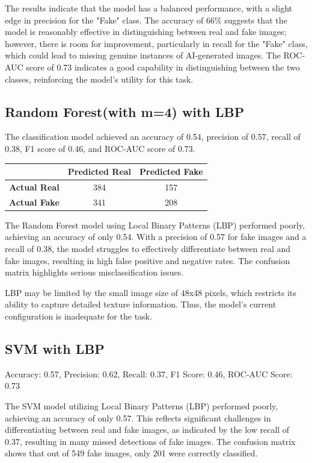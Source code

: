 \documentclass[10pt,twocolumn,letterpaper]{article}
\begin{document}
The results indicate that the model has a balanced performance, with a slight edge in precision for the "Fake" class. The accuracy of 66\% suggests that the model is reasonably effective in distinguishing between real and fake images; however, there is room for improvement, particularly in recall for the "Fake" class, which could lead to missing genuine instances of AI-generated images.
The ROC-AUC score of 0.73 indicates a good capability in distinguishing between the two classes, reinforcing the model's utility for this task.


\subsection{Random Forest(with m=4) with LBP}

The classification model achieved an accuracy of 0.54, precision of 0.57, recall of 0.38, F1 score of 0.46, and ROC-AUC score of 0.73.

\begin{table}[h]
    \centering
    \begin{tabular}{|c|c|c|}
        \hline
        & \textbf{Predicted Real} & \textbf{Predicted Fake} \\ \hline
        \textbf{Actual Real} & 384 & 157 \\ \hline
        \textbf{Actual Fake} & 341 & 208 \\ \hline
    \end{tabular}
\end{table}

The Random Forest model using Local Binary Patterns (LBP) performed poorly, achieving an accuracy of only 0.54. With a precision of 0.57 for fake images and a recall of 0.38, the model struggles to effectively differentiate between real and fake images, resulting in high false positive and negative rates. The confusion matrix  highlights serious misclassification issues.

LBP may be limited by the small image size of 48x48 pixels, which restricts its ability to capture detailed texture information. Thus, the model's current configuration is inadequate for the task. 
\subsection{SVM with LBP}

Accuracy: 0.57, Precision: 0.62, Recall: 0.37, F1 Score: 0.46, ROC-AUC Score: 0.73

The SVM model utilizing Local Binary Patterns (LBP) performed poorly, achieving an accuracy of only 0.57. This reflects significant challenges in differentiating between real and fake images, as indicated by the low recall of 0.37, resulting in many missed detections of fake images. The confusion matrix shows that out of 549 fake images, only 201 were correctly classified. 
\end{document}
